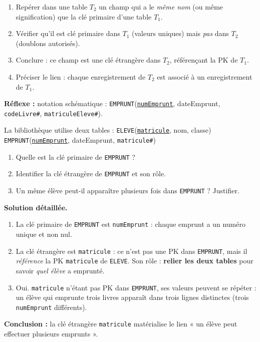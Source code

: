 \documentclass[11pt]{article}
\newcommand{\cle}[1]{{\popxbold\color{popdark}#1}}
\begin{document}
\begin{methode}
\begin{enumerate}
\item Repérer dans une table $T_2$ un champ qui a le \emph{même nom} (ou même signification) que la clé primaire d'une table $T_1$.
\item Vérifier qu'il est clé primaire dans $T_1$ (valeurs uniques) mais \emph{pas} dans $T_2$ (doublons autorisés).
\item Conclure : ce champ est une \cle{clé étrangère} dans $T_2$, référençant la PK de $T_1$.
\item Préciser le lien : chaque enregistrement de $T_2$ est associé à un enregistrement de $T_1$.
\end{enumerate}
\textbf{Réflexe :} notation schématique : \texttt{EMPRUNT}(\underline{\texttt{numEmprunt}}, dateEmprunt, \texttt{codeLivre\#}, \texttt{matriculeEleve\#}).
\end{methode}

\begin{exoresolu}
La bibliothèque utilise deux tables :
\texttt{ELEVE}(\underline{\texttt{matricule}}, nom, classe)
\texttt{EMPRUNT}(\underline{\texttt{numEmprunt}}, dateEmprunt, \texttt{matricule\#})

\begin{enumerate}
\item Quelle est la clé primaire de \texttt{EMPRUNT} ?
\item Identifier la clé étrangère de \texttt{EMPRUNT} et son rôle.
\item Un même élève peut-il apparaître plusieurs fois dans \texttt{EMPRUNT} ? Justifier.
\end{enumerate}
\tcblower
\textbf{Solution détaillée.}
\begin{enumerate}
\item La clé primaire de \texttt{EMPRUNT} est \texttt{numEmprunt} : chaque emprunt a un numéro unique et non nul.
\item La clé étrangère est \texttt{matricule} : ce n'est pas une PK dans \texttt{EMPRUNT}, mais il \emph{référence} la PK \texttt{matricule} de \texttt{ELEVE}. Son rôle : \textbf{relier les deux tables} pour savoir \emph{quel élève} a emprunté.
\item Oui. \texttt{matricule} n'étant pas PK dans \texttt{EMPRUNT}, ses valeurs peuvent se répéter : un élève qui emprunte trois livres apparaît dans trois lignes distinctes (trois \texttt{numEmprunt} différents).
\end{enumerate}
\textbf{Conclusion :} la clé étrangère \texttt{matricule} matérialise le lien « un élève peut effectuer plusieurs emprunts ».
\end{exoresolu}
\end{document}

